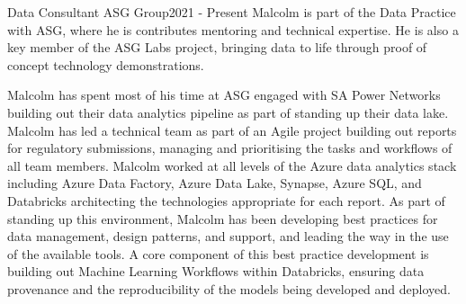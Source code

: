 

\begin{cventry}{Data Consultant} {ASG Group}{}{2021 - Present}
  Malcolm is part of the Data Practice with ASG,
  where he is contributes mentoring and technical expertise.
  He is also a key member of the ASG Labs project,
  bringing data to life through
  proof of concept technology demonstrations.

  Malcolm has spent most of his time at ASG engaged with SA Power Networks
  building out their data analytics pipeline
  as part of standing up their data lake.
  Malcolm has led a technical team as part of an Agile project
  building out reports for regulatory submissions,
  managing and prioritising the
  tasks and workflows of all team members.
  Malcolm worked at all levels of the Azure data analytics stack
  including Azure Data Factory, Azure Data Lake, Synapse, Azure SQL, and Databricks
  architecting the technologies appropriate for each report.
  As part of standing up this environment,
  Malcolm has been developing best practices
  for data management, design patterns, and support,
  and leading the way in the use of the available tools.
  A core component of this best practice development
  is building out Machine Learning Workflows within Databricks,
  ensuring data provenance and the reproducibility of the models
  being developed and deployed.
\end{cventry}

